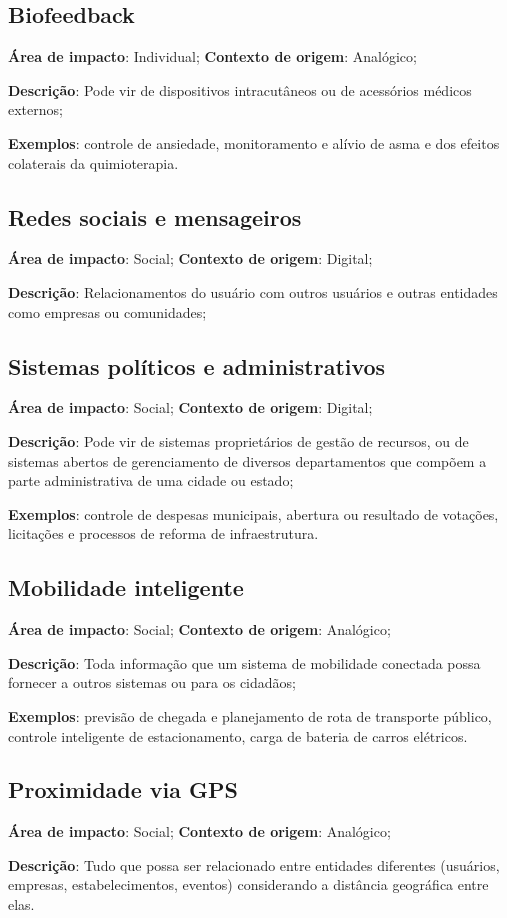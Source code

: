 \subsection{Biofeedback}

\textbf{Área de impacto}: Individual; \textbf{Contexto de origem}: Analógico;

\textbf{Descrição}: Pode vir de dispositivos intracutâneos ou de acessórios médicos externos;

\textbf{Exemplos}: controle de ansiedade, monitoramento e alívio de asma e dos efeitos colaterais da quimioterapia.

\subsection{Redes sociais e mensageiros}

\textbf{Área de impacto}: Social; \textbf{Contexto de origem}: Digital;

\textbf{Descrição}: Relacionamentos do usuário com outros usuários e outras entidades como empresas ou comunidades;

\subsection{Sistemas políticos e administrativos}

\textbf{Área de impacto}: Social; \textbf{Contexto de origem}: Digital;

\textbf{Descrição}: Pode vir de sistemas proprietários de gestão de recursos, ou de sistemas abertos de gerenciamento de diversos departamentos que compõem a parte administrativa de uma cidade ou estado;

\textbf{Exemplos}: controle de despesas municipais, abertura ou resultado de votações, licitações e processos de reforma de infraestrutura.

\subsection{Mobilidade inteligente}

\textbf{Área de impacto}: Social; \textbf{Contexto de origem}: Analógico;

\textbf{Descrição}: Toda informação que um sistema de mobilidade conectada possa fornecer a outros sistemas ou para os cidadãos;

\textbf{Exemplos}: previsão de chegada e planejamento de rota de transporte público, controle inteligente de estacionamento, carga de bateria de carros elétricos.

\subsection{Proximidade via GPS}

\textbf{Área de impacto}: Social; \textbf{Contexto de origem}: Analógico;

\textbf{Descrição}: Tudo que possa ser relacionado entre entidades diferentes (usuários, empresas, estabelecimentos, eventos) considerando a distância geográfica entre elas.